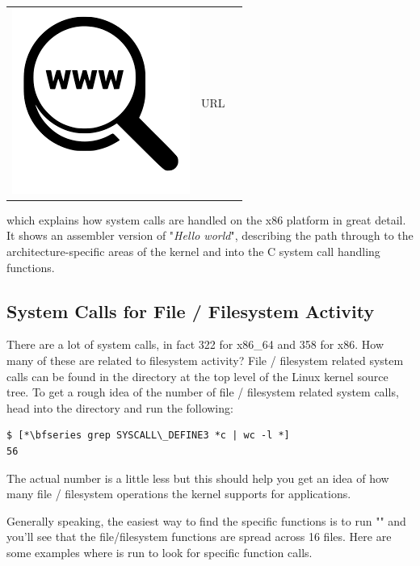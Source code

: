 \begin{table}[h]
\begin{tabular}{lcl}
\parbox[r]{0.5in}{\includegraphics[scale=0.15]{figures/url.png}} & \parbox[l]{0.55in}{URL } & \parbox[l]{3in}{}
\end{tabular}
\end{table}

\noindent
which explains how system calls are handled on the x86 platform in great detail. It shows an assembler version of "\textit{Hello world}", describing the path through to the architecture-specific areas of the kernel and into the C system call handling functions. 

\subsection{System Calls for File / Filesystem Activity}

There are a lot of system calls, in fact 322 for x86\_64 and 358 for x86. How many of these are related to filesystem activity? File / filesystem related system calls can be found in the  directory at the top level of the Linux kernel source tree. To get a rough idea of the number of file / filesystem related system calls, head into the  directory and run the following:

\begin{lstlisting}
$ [*\bfseries grep SYSCALL\_DEFINE3 *c | wc -l *]
56
\end{lstlisting}

\noindent
The actual number is a little less but this should help you get an idea of how many file / filesystem operations the kernel supports for applications.

Generally speaking, the easiest way to find the specific functions is to run "" and you'll see that the file/filesystem functions are spread across 16 files. Here are some examples where  is run to look for specific function calls.

